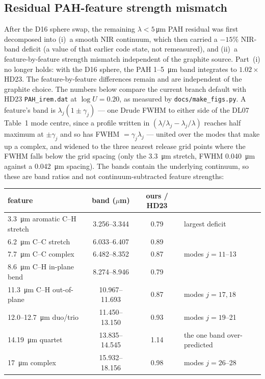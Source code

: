 \documentclass{my_memo}
\begin{document}
\subsection{Residual PAH-feature strength mismatch}
\label{sec:pah_feature_residual}

After the D16 sphere swap, the remaining $\lambda < 5$\,\si{\micro\metre}
PAH residual was first decomposed into (i)~a smooth NIR continuum, which
then carried a $-15\%$ NIR-band deficit (a value of that earlier code
state, not remeasured), and (ii)~a feature-by-feature strength mismatch
independent of the graphite source. Part~(i) no longer holds: with the
D16 sphere, the PAH 1--\SI{5}{\micro\meter} band integrates to
$1.02\times$ HD23. The feature-by-feature differences remain and are
independent of the graphite choice. The numbers below
compare the current branch default with HD23
\texttt{PAH\_irem.dat} at $\log U=0.20$, as measured by
\texttt{docs/make\_figs.py}. A
feature's band is $\lambda_j(1 \pm \gamma_j)$ --- one Drude FWHM to
either side of the DL07 Table~1 mode centre, since a profile written in
$(\lambda/\lambda_j - \lambda_j/\lambda)$ reaches half maximum at
$\pm\gamma_j$ and so has FWHM $= \gamma_j \lambda_j$ --- united over the
modes that make up a complex, and widened to the three nearest release
grid points where the FWHM falls below the grid spacing (only the
\SI{3.3}{\micro\meter} stretch, FWHM \SI{0.040}{\micro\meter} against a
\SI{0.042}{\micro\meter} spacing). The bands contain the underlying
continuum, so these are band ratios and not continuum-subtracted feature
strengths:

\begin{tabularx}{0.9\textwidth}{l c c X}
\toprule
feature & band ($\mu$m) & ours / HD23 & \\
\midrule
\SI{3.3}{\micro\meter} aromatic C--H stretch  & 3.256--3.344   & 0.79 & largest deficit \\
\SI{6.2}{\micro\meter} C--C stretch           & 6.033--6.407   & 0.89 & \\
\SI{7.7}{\micro\meter} C--C complex           & 6.482--8.352   & 0.87 & modes $j = 11$--13 \\
\SI{8.6}{\micro\meter} C--H in-plane bend     & 8.274--8.946   & 0.79 & \\
\SI{11.3}{\micro\meter} C--H out-of-plane     & 10.967--11.693 & 0.87 & modes $j = 17, 18$ \\
12.0--\SI{12.7}{\micro\meter} duo/trio        & 11.450--13.150 & 0.93 & modes $j = 19$--21 \\
\SI{14.19}{\micro\meter} quartet              & 13.835--14.545 & 1.14 & the one band over-predicted \\
\SI{17}{\micro\meter} complex                 & 15.932--18.156 & 0.98 & modes $j = 26$--28 \\
\bottomrule
\end{tabularx}
\end{document}
